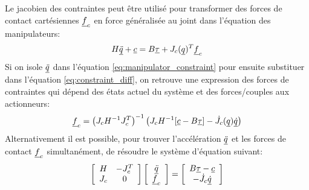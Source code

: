 Le jacobien des contraintes peut être utilisé pour transformer des forces de contact cartésiennes $\underline{f}_c$ en force généralisée au joint dans l'équation des manipulateurs:
%
\begin{align}
H \underline{\ddot{q}} + \underline{c} = B \underline{\tau} + J_c( \underline{ q } )^T  \underline{f}_c
\label{eq:manipulator_constraint}
\end{align}
%
Si on isole $\underline{\ddot{q}}$ dans l'équation \eqref{eq:manipulator_constraint} pour ensuite substituer dans l'équation \eqref{eq:constraint_diff}, on retrouve une expression des forces de contraintes qui dépend des états actuel du système et des forces/couples aux actionneurs:
%
\begin{align}
\underline{f}_c = \left( J_c H^{-1} J_c^T \right)^{-1} \left(  J_c H^{-1} [\underline{c} - B \underline{\tau} ] - \dot{J}_c( \underline{ q } ) \underline{\dot{q}}   \right)
\label{eq:const_forces}
\end{align}
%
Alternativement il est possible, pour trouver l'accélération $\underline{\ddot{q}}$ et les forces de contact $\underline{f}_c$ simultanément, de résoudre le système d'équation suivant:
%
\begin{align}
\left[ \begin{array}{c c } 	H & -J_c^T  \\ J_c 	& 0  	\end{array} \right] \left[ \begin{array}{c} \underline{\ddot{q}}  \\ \underline{f}_c \end{array} \right] = \left[ \begin{array}{c}  B \underline{\tau} - \underline{c}   \\ -\dot{J}_c \underline{\dot{q}}  \end{array} \right]
\label{eq:manipulator_constraint_eom}
\end{align}



